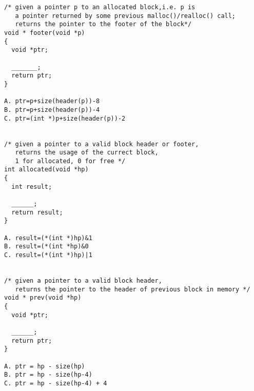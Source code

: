 \newpage
{\small\begin{verbatim}
/* given a pointer p to an allocated block,i.e. p is
   a pointer returned by some previous malloc()/realloc() call;
   returns the pointer to the footer of the block*/
void * footer(void *p)
{
  void *ptr;

  _______;
  return ptr;
}

A. ptr=p+size(header(p))-8  
B. ptr=p+size(header(p))-4  
C. ptr=(int *)p+size(header(p))-2 


/* given a pointer to a valid block header or footer,
   returns the usage of the currect block, 
   1 for allocated, 0 for free */
int allocated(void *hp)
{
  int result;

  ______;
  return result;
}

A. result=(*(int *)hp)&1  
B. result=(*(int *hp)&0  
C. result=(*(int *)hp)|1


/* given a pointer to a valid block header,
   returns the pointer to the header of previous block in memory */
void * prev(void *hp)
{
  void *ptr;

  ______;
  return ptr;
}

A. ptr = hp - size(hp)  
B. ptr = hp - size(hp-4)  
C. ptr = hp - size(hp-4) + 4

\end{verbatim}}

